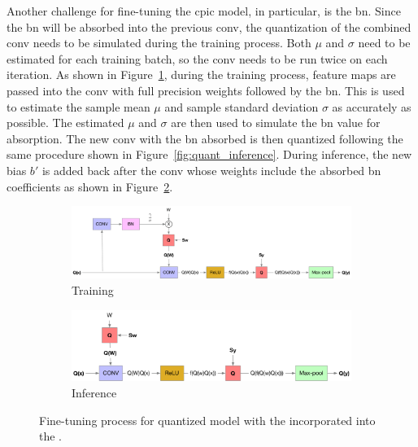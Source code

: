 \documentclass{article}
\begin{document}
Another challenge for fine-tuning the \gls{cpic} model, in particular, is the \gls{bn}.
Since the \gls{bn} will be absorbed into the previous \gls{conv}, the quantization of the combined \gls{conv} needs to be simulated during the training process.
Both $\mu$ and $\sigma$ need to be estimated for each training batch, so the \gls{conv} needs to be run twice on each iteration.
As shown in Figure~\ref{fig:quant_training_bn}, during the training process, feature maps are passed into the \gls{conv} with full precision weights followed by the \gls{bn}.
This is used to estimate the sample mean $\mu$ and sample standard deviation $\sigma$ as accurately as possible.
The estimated $\mu$ and $\sigma$ are then used to simulate the \gls{bn} value for absorption.
The new \gls{conv} with the \gls{bn} absorbed is then quantized following the same procedure shown in Figure~\ref{fig:quant_inference}.
During inference, the new bias $b'$ is added back after the \gls{conv} whose weights include the absorbed \gls{bn} coefficients as shown in Figure~\ref{fig:quant_inference_bn}.
%
\begin{figure}
    \centering
    \begin{subfigure}{\linewidth}
        \centering
        \includegraphics[width=\linewidth]{quant_train_bn}
        \caption{Training}
        \label{fig:quant_training_bn}
    \end{subfigure}
    \begin{subfigure}{\linewidth}
        \centering
        \includegraphics[width=\linewidth]{quant_inference_bn}
        \caption{Inference}
        \label{fig:quant_inference_bn}
    \end{subfigure}
    \caption{Fine-tuning process for quantized  model with the  incorporated into the .}
    \label{fig:quant_bn}
\end{figure}
\end{document}
